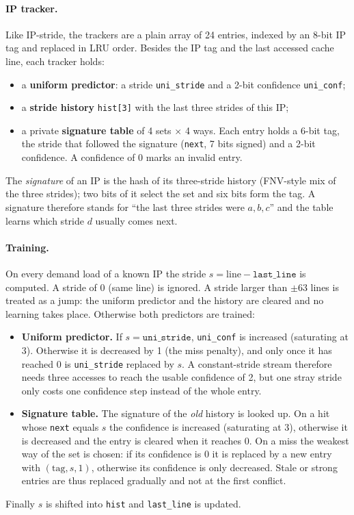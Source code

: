 \documentclass[11pt,a4paper]{article}
\begin{document}
\paragraph{IP tracker.}
Like IP-stride, the trackers are a plain array of 24 entries, indexed by an 8-bit IP tag and
replaced in LRU order. Besides the IP tag and the last accessed cache line, each tracker holds:
\begin{itemize}
    \item a \textbf{uniform predictor}: a stride \texttt{uni\_stride} and a 2-bit confidence
          \texttt{uni\_conf};
    \item a \textbf{stride history} \texttt{hist[3]} with the last three strides of this IP;
    \item a private \textbf{signature table} of 4 sets $\times$ 4 ways. Each entry holds a 6-bit tag,
          the stride that followed the signature (\texttt{next}, 7 bits signed) and a 2-bit
          confidence. A confidence of 0 marks an invalid entry.
\end{itemize}
The \emph{signature} of an IP is the hash of its three-stride history (FNV-style mix of the three
strides); two bits of it select the set and six bits form the tag. A signature therefore stands for
``the last three strides were $a,b,c$'' and the table learns which stride $d$ usually comes next.

\paragraph{Training.}
On every demand load of a known IP the stride $s = \text{line} - \texttt{last\_line}$ is computed.
A stride of 0 (same line) is ignored. A stride larger than $\pm 63$ lines is treated as a jump: the
uniform predictor and the history are cleared and no learning takes place. Otherwise both
predictors are trained:
\begin{itemize}
    \item \textbf{Uniform predictor.} If $s = \texttt{uni\_stride}$, \texttt{uni\_conf} is
          increased (saturating at 3). Otherwise it is decreased by 1 (the miss penalty), and only
          once it has reached 0 is \texttt{uni\_stride} replaced by $s$. A constant-stride stream
          therefore needs three accesses to reach the usable confidence of 2, but one stray
          stride only costs one confidence step instead of the whole entry.
    \item \textbf{Signature table.} The signature of the \emph{old} history is looked up. On a hit
          whose \texttt{next} equals $s$ the confidence is increased (saturating at 3), otherwise it
          is decreased and the entry is cleared when it reaches 0. On a miss the weakest way of the
          set is chosen: if its confidence is 0 it is replaced by a new entry with
          $(\text{tag}, s, 1)$, otherwise its confidence is only decreased. Stale or strong entries
          are thus replaced gradually and not at the first conflict.
\end{itemize}
Finally $s$ is shifted into \texttt{hist} and \texttt{last\_line} is updated.
\end{document}
